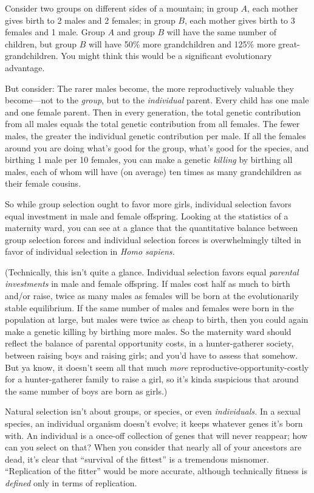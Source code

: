  Consider two groups on different sides of a mountain; in group $A$,
each mother gives birth to 2 males and 2 females; in group $B$, each
mother gives birth to 3 females and 1 male. Group $A$ and group $B$ will
have the same number of children, but group $B$ will have 50\% more
grandchildren and 125\% more great-grandchildren. You might think this
would be a significant evolutionary advantage.


 But consider: The rarer males become, the more reproductively
valuable they become---not to the \textit{group}, but to the
\textit{individual} parent. Every child has one male and one female
parent. Then in every generation, the total genetic contribution from
all males equals the total genetic contribution from all females. The
fewer males, the greater the individual genetic contribution per male.
If all the females around you are doing what's good for
the group, what's good for the species, and birthing 1
male per 10 females, you can make a genetic \textit{killing} by
birthing all males, each of whom will have (on average) ten times as
many grandchildren as their female cousins.


 So while group selection ought to favor more girls, individual
selection favors equal investment in male and female offspring. Looking
at the statistics of a maternity ward, you can see at a glance that the
quantitative balance between group selection forces and individual
selection forces is overwhelmingly tilted in favor of individual
selection in \textit{Homo sapiens.}


 (Technically, this isn't quite a glance.
Individual selection favors equal \textit{parental investments} in male
and female offspring. If males cost half as much to birth and/or raise,
twice as many males as females will be born at the evolutionarily
stable equilibrium. If the same number of males and females were born
in the population at large, but males were twice as cheap to birth,
then you could again make a genetic killing by birthing more males. So
the maternity ward should reflect the balance of parental opportunity
costs, in a hunter-gatherer society, between raising boys and raising
girls; and you'd have to assess that somehow. But ya
know, it doesn't seem all that much \textit{more}
reproductive-opportunity-costly for a hunter-gatherer family to raise a
girl, so it's kinda suspicious that around the same
number of boys are born as girls.)


 Natural selection isn't about groups, or species,
or even \textit{individuals.} In a sexual species, an individual
organism doesn't evolve; it keeps whatever genes
it's born with. An individual is a once-off collection
of genes that will never reappear; how can you select on that? When you
consider that nearly all of your ancestors are dead,
it's clear that ``survival of the
fittest'' is a tremendous misnomer.
``Replication of the fitter'' would
be more accurate, although technically fitness is \textit{defined} only
in terms of replication.


